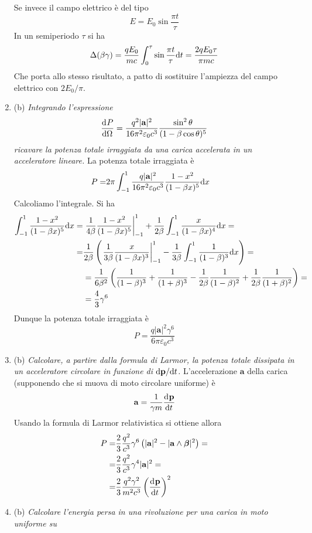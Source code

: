\documentclass{article}
\renewcommand{\b}{(b)}
\renewcommand{\t}[1]{\textit{ #1}}
\renewcommand{\vec}[1]{\mathbf{#1}}
\begin{document}
\begin{enumerate}
	\noindent Se invece il campo elettrico è del tipo 
	\[E=E_0\sin\frac{\pi t}{\tau}\]
	In un semiperiodo $\tau$ si ha
	\[\Delta(\beta\gamma)=\frac{qE_0}{mc}\int_{0}^{\tau}\sin\frac{\pi t}{\tau}\mathrm{d} t=\frac{2qE_0\tau}{\pi mc}\]
	Che porta allo stesso risultato, a patto di sostituire l'ampiezza del campo elettrico con $2E_0/\pi$.
	\item\b\t{Integrando l’espressione
		\[\der{P}{\Omega}=\frac{q^2|\vec{a}|^2}{16\pi^2\varepsilon_0c^3}\frac{\sin^2\theta}{(1-\beta\cos\theta)^5}\] ricavare la potenza totale
		irraggiata da una carica accelerata in un acceleratore lineare.}
	La potenza totale irraggiata è
	\begin{align*}P=&2\pi\int_{-1}^{1}\frac{q|\vec{a}|^2}{16\pi^2\varepsilon_0c^3}\frac{1-x^2}{(1-\beta x)^5}\d x\end{align*}
	Calcoliamo l'integrale. Si ha
	\begin{align*}
		\int_{-1}^{1}\frac{1-x^2}{(1-\beta x)^5}\mathrm{d} x=&\left.\frac{1}{4\beta}\frac{1-x^2}{(1-\beta x)^5}\right|_{-1}^{1}+\frac{1}{2\beta}\int_{-1}^{1}\frac{x}{(1-\beta x)^4}\mathrm{d} x=\\=&\frac{1}{2\beta}\left(\left.\frac{1}{3\beta}\frac{x}{(1-\beta x)^3}\right|_{-1}^{1}-\frac{1}{3\beta}\int_{-1}^{1}\frac{1}{(1-\beta)^3}\mathrm{d} x\right)=\\&=\frac{1}{6\beta^2}\left(\frac{1}{(1-\beta)^3}+\frac{1}{(1+\beta)^3}-\frac{1}{2\beta}\frac{1}{(1-\beta)^2}+\frac{1}{2\beta}\frac{1}{(1+\beta)^2}\right)=\\&=\frac{4}{3}\gamma^6
	\end{align*}
	Dunque la potenza totale irraggiata è
	\[P=\frac{q|\vec{a}|^2\gamma^6}{6\pi\varepsilon_0c^3}\]
	\item\b\t{Calcolare, a partire dalla formula di Larmor, la potenza totale dissipata in un
		acceleratore circolare in funzione di $\d \vec{p}/\d t$.} L'accelerazione $\vec{a}$ della carica (supponendo che si muova di moto circolare uniforme) è
	\[\vec{a}=\frac{1}{\gamma m}\der{\vec{p}}{t}\]
	Usando la formula di Larmor relativistica si ottiene allora
	\begin{align*}
		P=&\frac{2}{3}\frac{q^2}{c^3}\gamma^6\left(|\vec{a}|^2-|\vec{a}\wedge\bm{\beta}|^2\right)=\\=&\frac{2}{3}\frac{q^2}{c^3}\gamma^4|\vec{a}|^2=\\=&\frac{2}{3}\frac{q^2\gamma^2}{m^2c^3}\left(\der{\vec{p}}{t}\right)^2
	\end{align*}
	\item\b\t{Calcolare l’energia persa in una rivoluzione per una carica in moto uniforme su
}
\end{enumerate}
\end{document}
